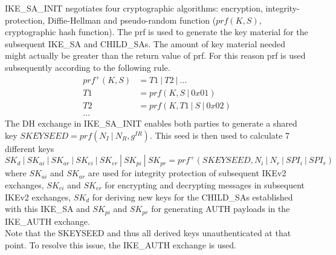IKE\_SA\_INIT negotiates four cryptographic algorithms: encryption, integrity-protection, Diffie-Hellman and pseudo-random function ($prf(K,S)$, cryptographic hash function).
The prf is used to generate the key material for the subsequent IKE\_SA and CHILD\_SAs.
The amount of key material needed might actually be greater than the return value of prf.
For this reason prf is used subsequently according to the following rule.
\begin{equation*}
  \begin{aligned}
    prf^+(K,S) & = T1~|~T2~|~\dots\\
    T1 & = prf(K,S~|~0x01)\\
    T2 & = prf(K,T1~|~S~|~0x02)\\
    \dots
  \end{aligned}
\end{equation*}
The DH exchange in IKE\_SA\_INIT enables both parties to generate a shared key $SKEYSEED = prf(N_I~|~N_R, g^{IR})$.
This seed is then used to calculate 7 different keys 
\begin{equation*}
  SK_d~|~SK_{ai}~|~SK_{ar}~|~SK_{ei}~|~SK_{er}~|~SK_{pi}~|~SK_{pr} = prf^+(SKEYSEED, N_i~|~N_r~|~SPI_i~|~SPI_r)
\end{equation*}
where $SK_{ai}$ and $SK_{ar}$ are used for integrity protection of subsequent IKEv2 exchanges, $SK_{ei}$ and $SK_{er}$ for encrypting and decrypting messages in subsequent IKEv2 exchanges, $SK_d$ for deriving new keys for the CHILD\_SAs established with this IKE\_SA and $SK_{pi}$ and $SK_{pr}$ for generating AUTH payloads in the IKE\_AUTH exchange.\\

Note that the SKEYSEED and thus all derived keys unauthenticated at that point.
To resolve this issue, the IKE\_AUTH exchange is used.

